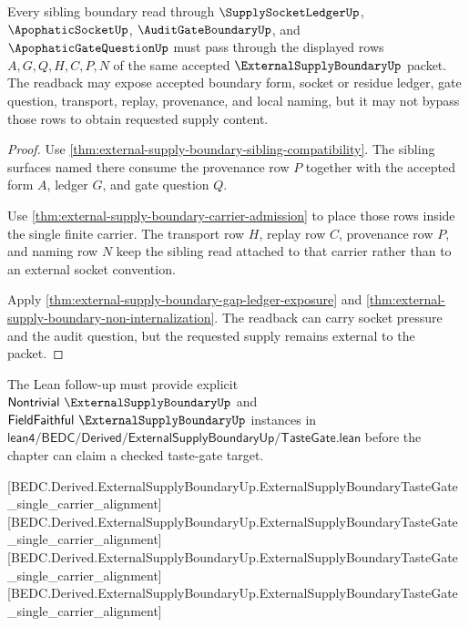 \begin{theorem}
\label{thm:external-supply-boundary-socket-readback}
Every sibling boundary read through $\SupplySocketLedgerUp$,
$\ApophaticSocketUp$, $\AuditGateBoundaryUp$, and
$\ApophaticGateQuestionUp$ must pass through the displayed rows
$A,G,Q,H,C,P,N$ of the same accepted $\ExternalSupplyBoundaryUp$ packet. The
readback may expose accepted boundary form, socket or residue ledger, gate
question, transport, replay, provenance, and local naming, but it may not bypass
those rows to obtain requested supply content.
\end{theorem}
\begin{proof}
Use \autoref{thm:external-supply-boundary-sibling-compatibility}. The sibling
surfaces named there consume the provenance row $P$ together with the accepted
form $A$, ledger $G$, and gate question $Q$.

Use \autoref{thm:external-supply-boundary-carrier-admission} to place those rows
inside the single finite carrier. The transport row $H$, replay row $C$,
provenance row $P$, and naming row $N$ keep the sibling read attached to that
carrier rather than to an external socket convention.

Apply \autoref{thm:external-supply-boundary-gap-ledger-exposure} and
\autoref{thm:external-supply-boundary-non-internalization}. The readback can
carry socket pressure and the audit question, but the requested supply remains
external to the packet.
\end{proof}



The Lean follow-up must provide explicit $\mathsf{Nontrivial}\ \ExternalSupplyBoundaryUp$ and $\mathsf{FieldFaithful}\ \ExternalSupplyBoundaryUp$ instances in $\mathsf{lean4/BEDC/Derived/ExternalSupplyBoundaryUp/TasteGate.lean}$ before the chapter can claim a checked taste-gate target.

[BEDC.Derived.ExternalSupplyBoundaryUp.ExternalSupplyBoundaryTasteGate\_single\_carrier\_alignment]
[BEDC.Derived.ExternalSupplyBoundaryUp.ExternalSupplyBoundaryTasteGate\_single\_carrier\_alignment]
[BEDC.Derived.ExternalSupplyBoundaryUp.ExternalSupplyBoundaryTasteGate\_single\_carrier\_alignment]
[BEDC.Derived.ExternalSupplyBoundaryUp.ExternalSupplyBoundaryTasteGate\_single\_carrier\_alignment]

